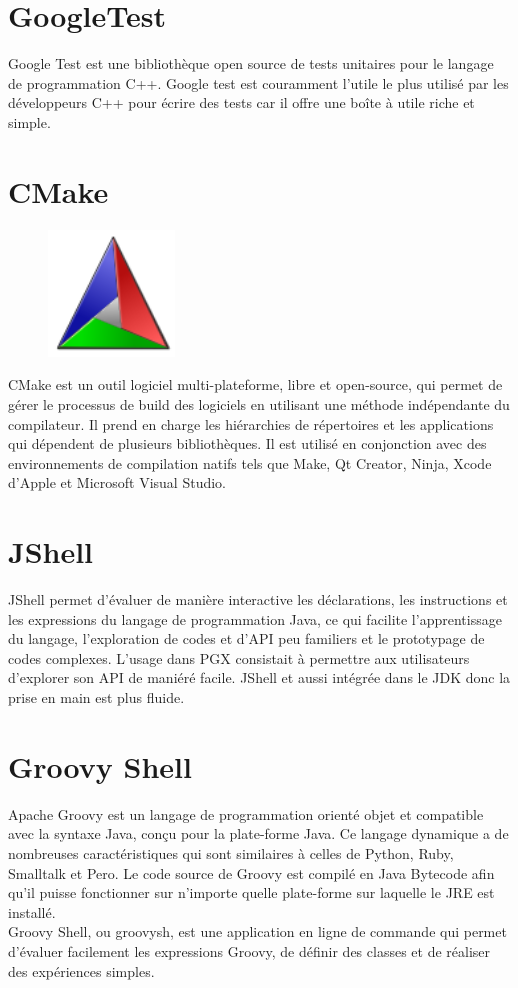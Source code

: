 \section{GoogleTest}
Google Test est une bibliothèque open source de tests unitaires pour le langage de programmation C++. Google test est couramment l’utile le plus utilisé par les développeurs C++ pour écrire des tests car il offre une boîte à utile riche et simple.

\section{CMake}
\begin{figure}[H]  
 \centering
    \includegraphics[width=0.3\textwidth]{annexe/Figures/Cmake_logo.svg.png}
\end{figure}
CMake est un outil logiciel multi-plateforme, libre et open-source, qui permet de gérer le processus de build des logiciels en utilisant une méthode indépendante du compilateur. Il prend en charge les hiérarchies de répertoires et les applications qui dépendent de plusieurs bibliothèques. Il est utilisé en conjonction avec des environnements de compilation natifs tels que Make, Qt Creator, Ninja, Xcode d'Apple et Microsoft Visual Studio.

\section{JShell}
JShell permet d'évaluer de manière interactive les déclarations, les instructions et les expressions du langage de programmation Java, ce qui facilite l'apprentissage du langage, l'exploration de codes et d'API peu familiers et le prototypage de codes complexes. L’usage dans PGX consistait à permettre aux utilisateurs d’explorer son API de maniéré facile. JShell et aussi intégrée dans le JDK donc la prise en main est plus fluide.

\section{Groovy Shell}
Apache Groovy est un langage de programmation orienté objet et compatible avec la syntaxe Java, conçu pour la plate-forme Java. Ce langage dynamique a de nombreuses caractéristiques qui sont similaires à celles de Python, Ruby, Smalltalk et Pero. Le code source de Groovy est compilé en Java Bytecode afin qu'il puisse fonctionner sur n'importe quelle plate-forme sur laquelle le JRE est installé.\\
Groovy Shell, ou groovysh, est une application en ligne de commande qui permet d'évaluer facilement les expressions Groovy, de définir des classes et de réaliser des expériences simples.
